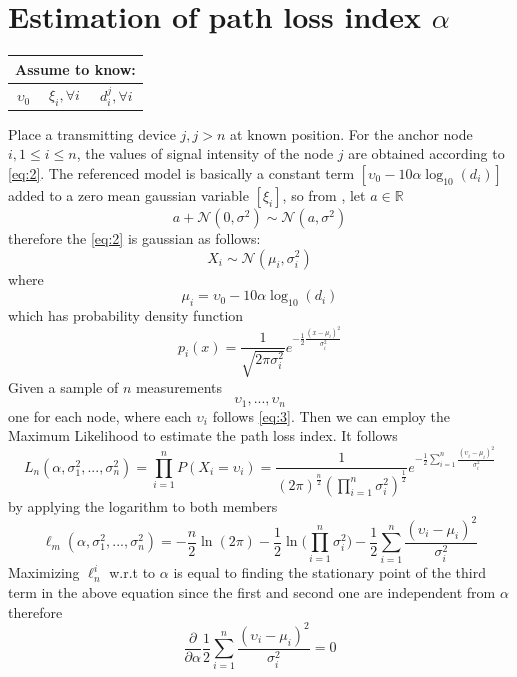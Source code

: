 \documentclass[12pt]{report}
\begin{document}
\section{Estimation of path loss index $\alpha$}
\begin{center}
    \begin{tabular}{ |c|c|c| } 
    \hline
    \multicolumn{3}{|c|}{ \textbf{Assume to know:} } \\
    \hline
    $\upsilon_0$ & $\xi_i,\forall i$ &$d_i^j,\forall i$ \\
    \hline
    \end{tabular}
\end{center}
  Place a transmitting device $j,j>n$ at known position. For the anchor node $i,1\leq i\leq n$, the values of signal intensity of the node $j$ are obtained according to \eqref{eq:2}. The referenced model is basically a constant term $[\upsilon_0-10\alpha\log_{10}(d_i)]$ added to a zero mean gaussian variable $[\xi_i]$, so from \cite{alma9926534668905776}, let $a \in \mathbb{R}$
\begin{equation}
a+\mathcal{N}(0,\sigma^2)\sim\mathcal{N}(a,\sigma^2)
\end{equation} therefore the \eqref{eq:2} is gaussian as follows:
\begin{equation}
    X_i\sim \mathcal{N}(\mu_i,\sigma^2_i)
    \label{eq:3}
\end{equation}
where 
\begin{equation}
    \mu_i = \upsilon_0-10\alpha\log_{10}(d_i)
\end{equation}
which has probability density function
\begin{equation}
    p_i(x)=\frac{1}{\sqrt{2\pi\sigma_i^2}}e^{-\frac{1}{2}\frac{(x-\mu_i)^2}{\sigma^2_i}}
\end{equation} 
Given a sample of $n$ measurements $$\upsilon_1,...,\upsilon_n$$ one for each node, where each $\upsilon_i$ follows \eqref{eq:3}. Then we can employ the Maximum Likelihood to estimate the path loss index. It follows
\begin{equation}
    L_n(\alpha,\sigma_1^2,...,\sigma_n^2)=\prod_{i=1}^nP(X_i=\upsilon_i)=
    \frac{1}{(2\pi)^{\frac{n}{2}}(\prod_{i=1}^n\sigma_i^2)^\frac{1}{2}}e^{-\frac{1}{2}\sum_{i=1}^n\frac{(\upsilon_i-\mu_i)^2}{\sigma^2_i}}
\end{equation}
by applying the logarithm to both members
\begin{equation}
    \ell_m(\alpha,\sigma_1^2,...,\sigma_n^2)=-\frac{n}{2}\ln(2\pi)-\frac{1}{2}\ln\bigg(\prod_{i=1}^n\sigma^2_i\bigg)-\frac{1}{2}\sum_{i=1}^n\frac{(\upsilon_i-\mu_i)^2}{\sigma^2_i}
\end{equation}
Maximizing $\ell_n^i$ w.r.t to $\alpha$ is equal to finding the stationary point of the third term in the above equation since the first and second one are independent from $\alpha$ therefore \cite{MUNOZ200923} 
\begin{equation}
\frac{\partial}{\partial \alpha} \frac{1}{2}\sum_{i=1}^n\frac{(\upsilon_i-\mu_i)^2}{\sigma^2_i} =0
\end{equation}
\end{document}
